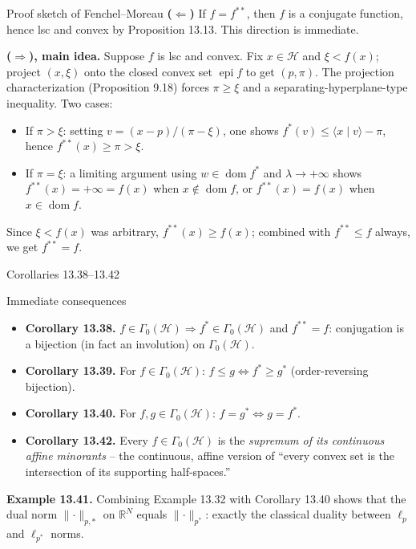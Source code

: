 \documentclass[aspectratio=169,10pt]{beamer}
\newcommand{\R}{\mathbb{R}}
\newcommand{\Hil}{\mathcal{H}}
\newcommand{\inner}[2]{\langle #1 \mid #2 \rangle}
\newcommand{\norm}[1]{\lVert #1 \rVert}
\newcommand{\dom}{\operatorname{dom}}
\newcommand{\epi}{\operatorname{epi}}
\newcommand{\GammaZero}{\Gamma_0(\Hil)}
\newcommand{\conj}[1]{#1^{*}}
\newcommand{\biconj}[1]{#1^{**}}
\begin{document}
\begin{frame}{Proof sketch of Fenchel--Moreau}
  \textbf{($\Leftarrow$)} If $f=\biconj f$, then $f$ is a conjugate
  function, hence lsc and convex by Proposition 13.13. This direction is
  immediate.

  \medskip
  \textbf{($\Rightarrow$), main idea.} Suppose $f$ is lsc and convex. Fix
  $x\in\Hil$ and $\xi<f(x)$; project $(x,\xi)$ onto the closed convex set
  $\epi f$ to get $(p,\pi)$. The projection characterization
  (Proposition 9.18) forces $\pi\ge\xi$ and a separating-hyperplane-type
  inequality. Two cases:
  \begin{itemize}
    \item If $\pi>\xi$: setting $v=(x-p)/(\pi-\xi)$, one shows
      $\conj f(v)\le\inner xv-\pi$, hence $\biconj f(x)\ge\pi>\xi$.
    \item If $\pi=\xi$: a limiting argument using $w\in\dom \conj f$ and
      $\lambda\to+\infty$ shows $\biconj f(x)=+\infty=f(x)$ when
      $x\notin\dom f$, or $\biconj f(x)=f(x)$ when $x\in\dom f$.
  \end{itemize}
  Since $\xi<f(x)$ was arbitrary, $\biconj f(x)\ge f(x)$; combined with
  $\biconj f\le f$ always, we get $\biconj f = f$.
\end{frame}

\begin{frame}{Corollaries 13.38--13.42}
  \begin{block}{Immediate consequences}
    \begin{itemize}
      \item \textbf{Corollary 13.38.} $f\in\GammaZero \Rightarrow
        \conj f\in\GammaZero$ and $\biconj f=f$: conjugation is a bijection
        (in fact an involution) on $\GammaZero$.
      \item \textbf{Corollary 13.39.} For $f\in\GammaZero$:
        $f\le g \iff \conj f\ge \conj g$ (order-reversing bijection).
      \item \textbf{Corollary 13.40.} For $f,g\in\GammaZero$:
        $f=\conj g \iff g=\conj f$.
      \item \textbf{Corollary 13.42.} Every $f\in\GammaZero$ is the
        \emph{supremum of its continuous affine minorants} -- the
        continuous, affine version of ``every convex set is the
        intersection of its supporting half-spaces.''
    \end{itemize}
  \end{block}
  \textbf{Example 13.41.} Combining Example 13.32 with Corollary 13.40
  shows that the dual norm $\norm\cdot_{p,*}$ on $\R^N$ equals
  $\norm\cdot_{p^{*}}$: exactly the classical duality between $\ell_p$ and
  $\ell_{p^{*}}$ norms.
\end{frame}
\end{document}
